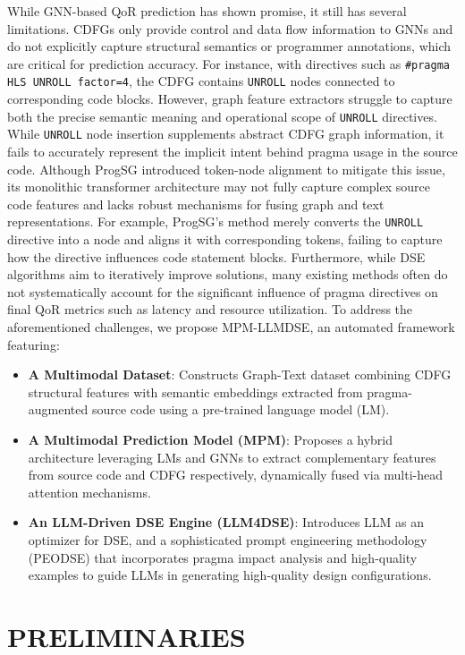 \documentclass[conference]{IEEEtran}
\begin{document}
    While GNN-based QoR prediction has shown promise, it still has several limitations. CDFGs only provide control and data flow information to GNNs and do not explicitly capture structural semantics or programmer annotations, which are critical for prediction accuracy. For instance, with directives such as \verb|#pragma HLS UNROLL factor=4|, the CDFG contains \verb|UNROLL| nodes connected to corresponding code blocks. However, graph feature extractors struggle to capture both the precise semantic meaning and operational scope of \verb|UNROLL| directives. While \verb|UNROLL| node insertion supplements abstract CDFG graph information, it fails to accurately represent the implicit intent behind pragma usage in the source code. Although ProgSG \cite{Qin2024} introduced token-node alignment to mitigate this issue, its monolithic transformer architecture may not fully capture complex source code features and lacks robust mechanisms for fusing graph and text representations. For example, ProgSG's method merely converts the \verb|UNROLL| directive into a node and aligns it with corresponding tokens, failing to capture how the directive influences code statement blocks. Furthermore, while DSE algorithms aim to iteratively improve solutions, many existing methods often do not systematically account for the significant influence of pragma directives on final QoR metrics such as latency and resource utilization. To address the aforementioned challenges, we propose MPM-LLMDSE, an automated framework featuring:
	\begin{itemize}
		\item [1)] \textbf{A Multimodal Dataset}: Constructs Graph-Text dataset combining CDFG structural features with semantic embeddings extracted from pragma-augmented source code using a pre-trained language model (LM).
		\item [2)] \textbf{A Multimodal Prediction Model (MPM)}: Proposes a hybrid architecture leveraging LMs and GNNs to extract complementary features from source code and CDFG respectively, dynamically fused via multi-head attention mechanisms.
		\item [3)] \textbf{An LLM-Driven DSE Engine (LLM4DSE)}: Introduces LLM as an optimizer for DSE, and a sophisticated prompt engineering methodology (PEODSE) that incorporates pragma impact analysis and high-quality examples to guide LLMs in generating high-quality design configurations.
	\end{itemize}
	
\section{PRELIMINARIES}		
\end{document}
